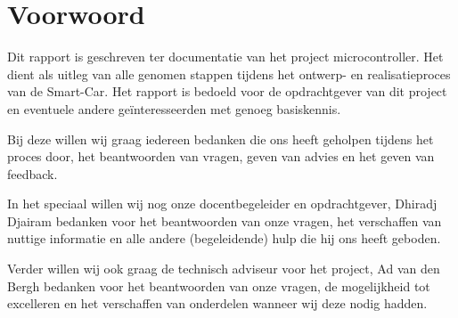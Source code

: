 \section{Voorwoord}
Dit rapport is geschreven ter documentatie van het project microcontroller. Het dient als uitleg van alle genomen stappen tijdens het ontwerp- en realisatieproces van de \gls{Smart-Car}.  Het rapport is bedoeld voor de opdrachtgever van dit project en eventuele andere geïnteresseerden met genoeg basiskennis. 

Bij deze willen wij graag iedereen bedanken die ons heeft geholpen tijdens het proces door, het beantwoorden van vragen, geven van advies en het geven van feedback. 

In het speciaal willen wij nog onze docentbegeleider en opdrachtgever, Dhiradj Djairam bedanken voor het beantwoorden van onze vragen, het verschaffen van nuttige informatie en alle andere (begeleidende) hulp die hij ons heeft geboden. 

Verder willen wij ook graag de technisch adviseur voor het project, Ad van den Bergh bedanken voor het beantwoorden van onze vragen, de mogelijkheid tot excelleren en het verschaffen van onderdelen wanneer wij deze nodig hadden. 
